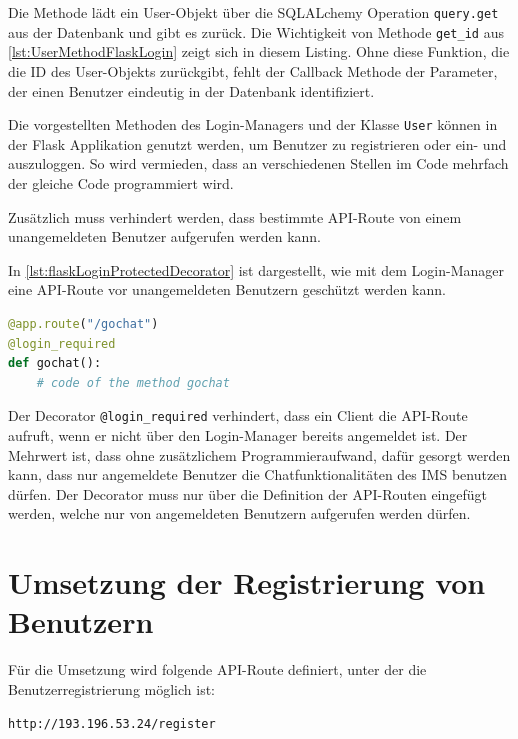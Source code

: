 \documentclass[a4paper,titlepage,halfparskip,12pt]{scrreprt}
\begin{document}
\begin{onehalfspacing}
Die Methode lädt ein User-Objekt über die SQLALchemy Operation \texttt{query.get} aus der Datenbank und gibt es zurück. Die Wichtigkeit von Methode \texttt{get\_id} aus \autoref{lst:UserMethodFlaskLogin} zeigt sich in diesem Listing. Ohne diese Funktion, die die ID des User-Objekts zurückgibt, fehlt der Callback Methode der Parameter, der einen Benutzer eindeutig in der Datenbank identifiziert.\cite{flaskLogin}

Die vorgestellten Methoden des Login-Managers und der Klasse \texttt{User} können in der Flask Applikation genutzt werden, um Benutzer zu registrieren oder ein- und auszuloggen. So wird vermieden, dass an verschiedenen Stellen im Code mehrfach der gleiche Code programmiert wird.

Zusätzlich muss verhindert werden, dass bestimmte \acs{API}-Route von einem unangemeldeten Benutzer aufgerufen werden kann.

In \autoref{lst:flaskLoginProtectedDecorator} ist dargestellt, wie mit dem Login-Manager eine \acs{API}-Route vor unangemeldeten Benutzern geschützt werden kann.

\begin{lstlisting}[language=python, caption={Code für den Schutz der \acs{API}-Route vor unangemeldeten Benutzern}, label={lst:flaskLoginProtectedDecorator}]
@app.route("/gochat")
@login_required
def gochat():
    # code of the method gochat
\end{lstlisting}

Der Decorator \texttt{@login\_required} verhindert, dass ein Client die \acs{API}-Route aufruft, wenn er nicht über den Login-Manager bereits angemeldet ist. Der Mehrwert ist, dass ohne zusätzlichem Programmieraufwand, dafür gesorgt werden kann, dass nur angemeldete Benutzer die Chatfunktionalitäten des \acs{IMS} benutzen dürfen. Der Decorator muss nur über die Definition der \acs{API}-Routen eingefügt werden, welche nur von angemeldeten Benutzern aufgerufen werden dürfen.\cite{flaskLogin}

\pagebreak

\section{Umsetzung der Registrierung von Benutzern}

Für die Umsetzung wird folgende \acs{API}-Route definiert, unter der die Benutzerregistrierung möglich ist:

\texttt{http://193.196.53.24/register}


\end{onehalfspacing}
\end{document}
